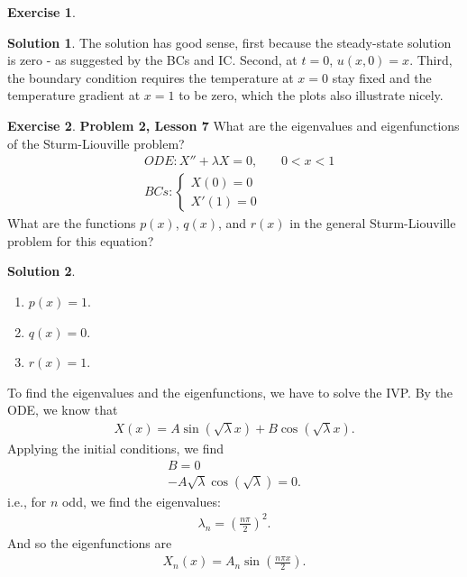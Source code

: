 \documentclass{article}
\theoremstyle{definition}
\newtheorem*{exer*}{Exercise}
\newtheorem*{sln*}{Solution}
\begin{document}
\begin{exer*}
\begin{sln*}
		\noindent The solution has good sense, first because the steady-state solution is zero - as suggested by the BCs and IC. Second, at $t=0$, $u(x,0) = x$. Third, the boundary condition requires the temperature at $x=0$ stay fixed and the temperature gradient at $x=1$ to be zero, which the plots also illustrate nicely. 
	\end{sln*}
	
\end{exer*}
\newpage









\begin{exer*}\textbf{Problem 2, Lesson 7}
	What are the eigenvalues and eigenfunctions of the Sturm-Liouville problem?
	\begin{align*}
	&ODE: X'' + \lambda X = 0,\,\,\,\,\,\,\,\,\,\,\, 0<x<1\\
	&BCs:  
	\begin{cases}
	X(0) = 0\\
	X'(1) = 0
	\end{cases}
	\end{align*}
	What are the functions $p(x)$, $q(x)$, and $r(x)$ in the general Sturm-Liouville problem for this equation? 
	
	\begin{sln*} 
		$\,$
		\begin{enumerate}
			\item $p(x) = 1$.
			\item $q(x) = 0$.
			\item $r(x) = 1$.
		\end{enumerate}
		To find the eigenvalues and the eigenfunctions, we have to solve the IVP. By the ODE, we know that 
		\begin{align*}
		X(x) = A\sin(\sqrt{\lambda}x) + B\cos(\sqrt{\lambda} x).
		\end{align*}
		Applying the initial conditions, we find 
		\begin{align*}
		B = 0\\
		-A\sqrt{\lambda}\cos(\sqrt{\lambda}) = 0.
		\end{align*}
		i.e., for $n$ odd, we find the eigenvalues:
		\begin{align*}
		\lambda_n = \left( \frac{n\pi}{2} \right)^2.
		\end{align*}
		And so the eigenfunctions are
		\begin{align*}
		X_n(x) = A_n\sin\left( \frac{n\pi x}{2} \right).
		\end{align*}
	\end{sln*}
\end{exer*}
\newpage
\end{document}
